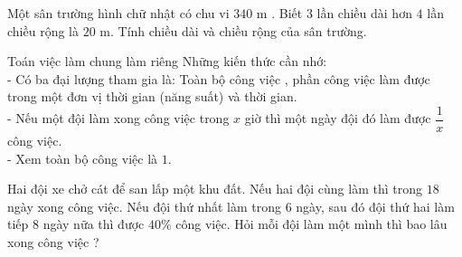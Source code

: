 \begin{vd}%
	Một sân trường hình chữ nhật có chu vi $340$ m . Biết $3$ lần chiều dài hơn $4$ lần chiều rộng là $20$ m. Tính chiều dài và chiều rộng của sân trường.
\end{vd}




\begin{dang}{Toán việc làm chung làm riêng}
	Những kiến thức cần nhớ:\\
	- Có ba đại lượng tham gia là: Toàn bộ công việc , phần công việc làm được trong một đơn vị thời gian (năng suất) và thời gian.\\
	- Nếu một đội làm xong công việc trong $x$ giờ thì một ngày đội đó làm được $\dfrac{1}{x}$ công việc.\\
	- Xem toàn bộ công việc là $1$.\\
\end{dang}

\begin{vd}
	Hai đội xe chở cát để san lấp một khu đất. Nếu hai đội cùng làm thì trong $18$ ngày xong công việc. Nếu đội thứ nhất làm trong $6$ ngày, sau đó đội thứ hai làm tiếp $8$ ngày nữa thì được  $40\%$ công việc. Hỏi mỗi đội làm một mình thì bao lâu xong công việc ?
\end{vd}

